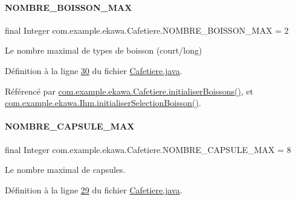 \paragraph{\texorpdfstring{N\+O\+M\+B\+R\+E\+\_\+\+B\+O\+I\+S\+S\+O\+N\+\_\+\+M\+AX}{NOMBRE\_BOISSON\_MAX}}
{\footnotesize\ttfamily final Integer com.\+example.\+ekawa.\+Cafetiere.\+N\+O\+M\+B\+R\+E\+\_\+\+B\+O\+I\+S\+S\+O\+N\+\_\+\+M\+AX = 2\hspace{0.3cm}{\ttfamily [static]}}



Le nombre maximal de types de boisson (court/long) 



Définition à la ligne \hyperlink{_cafetiere_8java_source_l00030}{30} du fichier \hyperlink{_cafetiere_8java_source}{Cafetiere.\+java}.



Référencé par \hyperlink{_cafetiere_8java_source_l00173}{com.\+example.\+ekawa.\+Cafetiere.\+initialiser\+Boissons()}, et \hyperlink{_ihm_8java_source_l00470}{com.\+example.\+ekawa.\+Ihm.\+initialiser\+Selection\+Boisson()}.

\mbox{\label{classcom_1_1example_1_1ekawa_1_1_cafetiere_a183d96e89c056c4ac9c565bf8f24851e}} 
\paragraph{\texorpdfstring{N\+O\+M\+B\+R\+E\+\_\+\+C\+A\+P\+S\+U\+L\+E\+\_\+\+M\+AX}{NOMBRE\_CAPSULE\_MAX}}
{\footnotesize\ttfamily final Integer com.\+example.\+ekawa.\+Cafetiere.\+N\+O\+M\+B\+R\+E\+\_\+\+C\+A\+P\+S\+U\+L\+E\+\_\+\+M\+AX = 8\hspace{0.3cm}{\ttfamily [static]}}



Le nombre maximal de capsules. 



Définition à la ligne \hyperlink{_cafetiere_8java_source_l00029}{29} du fichier \hyperlink{_cafetiere_8java_source}{Cafetiere.\+java}.



